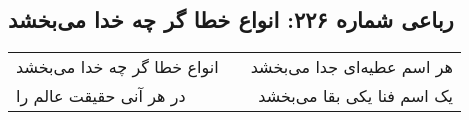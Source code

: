 \begin{center}
\section*{رباعی شماره ۲۲۶: انواع خطا گر چه خدا می‌بخشد}
\label{sec:sh226}
\begin{longtable}{l p{0.5cm} r}
انواع خطا گر چه خدا می‌بخشد
&&
هر اسم عطیه‌ای جدا می‌بخشد
\\
در هر آنی حقیقت عالم را
&&
یک اسم فنا یکی بقا می‌بخشد
\\
\end{longtable}
\end{center}
